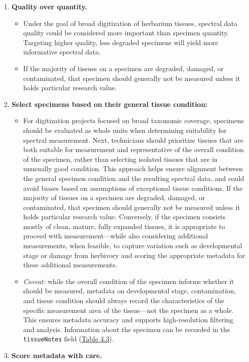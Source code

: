 \documentclass[
  letterpaper,
  DIV=11,
  numbers=noendperiod]{scrreprt}
\providecommand{\tightlist}{%
  \setlength{\itemsep}{0pt}\setlength{\parskip}{0pt}}
\begin{document}
\begin{enumerate}
\def\labelenumi{\arabic{enumi}.}
\tightlist
\item
  \textbf{Quality over quantity.}

  \begin{itemize}
  \tightlist
  \item
    Under the goal of broad digitization of herbarium tissues, spectral
    data quality could be considered more important than specimen
    quantity. Targeting higher quality, less degraded specimens will
    yield more informative spectral data.\\
  \item
    If the majority of tissues on a specimen are degraded, damaged, or
    contaminated, that specimen should generally not be measured unless
    it holds particular research value.
  \end{itemize}
\item
  \textbf{Select specimens based on their general tissue condition:}

  \begin{itemize}
  \tightlist
  \item
    For digitization projects focused on broad taxonomic coverage,
    specimens should be evaluated as whole units when determining
    suitability for spectral measurement. Next, technicians should
    prioritize tissues that are both suitable for measurement and
    representative of the overall condition of the specimen, rather than
    selecting isolated tissues that are in unusually good condition.
    This approach helps ensure alignment between the general specimen
    condition and the resulting spectral data, and could avoid biases
    based on assumptions of exceptional tissue conditions. If the
    majority of tissues on a specimen are degraded, damaged, or
    contaminated, that specimen should generally not be measured unless
    it holds particular research value. Conversely, if the specimen
    consists mostly of clean, mature, fully expanded tissues, it is
    appropriate to proceed with measurement---while also considering
    additional measurements, when feasible, to capture variation such as
    developmental stage or damage from herbivory and scoring the
    appropriate metadata for these additional measurements.\\
  \item
    \emph{Caveat:} while the overall condition of the specimen informs
    whether it should be measured, metadata on developmental stage,
    contamination, and tissue condition should always record the
    characteristics of the specific measurement area of the tissue---not
    the specimen as a whole. This ensures metadata accuracy and supports
    high-resolution filtering and analysis. Information about the
    specimen can be recorded in the \texttt{tissueNotes} field
    (\hyperref[tbl-4-3]{Table 4.3}).
  \end{itemize}
\item
  \textbf{Score metadata with care.}


\end{enumerate}
\end{document}
